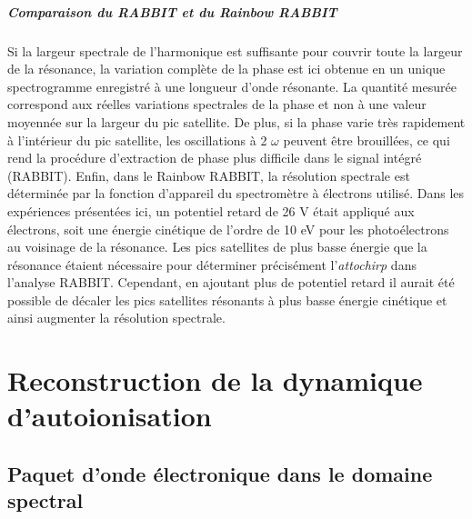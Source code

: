 \paragraph*{Comparaison du RABBIT et du Rainbow RABBIT} Si la largeur spectrale de l'harmonique est suffisante pour couvrir toute la largeur de la résonance, la variation complète de la phase est ici obtenue en un unique spectrogramme enregistré à une longueur d'onde résonante. La quantité mesurée correspond aux réelles variations spectrales de la phase et non à une valeur moyennée sur la largeur du pic satellite. De plus, si la phase varie très rapidement à l'intérieur du pic satellite, les oscillations à 2 $\omega$ peuvent être brouillées, ce qui rend la procédure d'extraction de phase plus difficile dans le signal intégré (RABBIT). Enfin, dans le Rainbow RABBIT, la résolution spectrale est déterminée par la fonction d'appareil du spectromètre à électrons utilisé. Dans les expériences présentées ici, un potentiel retard de 26 V était appliqué aux électrons, soit une énergie cinétique de l'ordre de 10 eV pour les photoélectrons au voisinage de la résonance. Les pics satellites de plus basse énergie que la résonance étaient nécessaire pour déterminer précisément l'\textit{attochirp} dans l'analyse RABBIT. Cependant, en ajoutant plus de potentiel retard il aurait été possible de décaler les pics satellites résonants à plus basse énergie cinétique et ainsi augmenter la résolution spectrale.

\chapter{Reconstruction de la dynamique d'autoionisation}
\label{chap:HeSaclay_reconstruction}
\section{Paquet d'onde électronique dans le domaine spectral}
